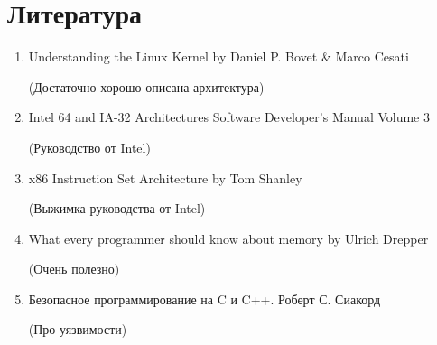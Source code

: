 \documentclass[../../lectures.tex]{subfiles}
\begin{document}
\section{Литература}
\begin{enumerate}
    \item Understanding the Linux Kernel by Daniel P. Bovet \& Marco Cesati

          (Достаточно хорошо описана архитектура)
    \item Intel 64 and IA-32 Architectures Software Developer's Manual Volume 3

          (Руководство от Intel)
    \item x86 Instruction Set Architecture by Tom Shanley

          (Выжимка руководства от Intel)
    \item What every programmer should know about memory by Ulrich Drepper

          (Очень полезно)
    \item Безопасное программирование на C и C++. Роберт С. Сиакорд

          (Про уязвимости)
\end{enumerate}
\end{document}
